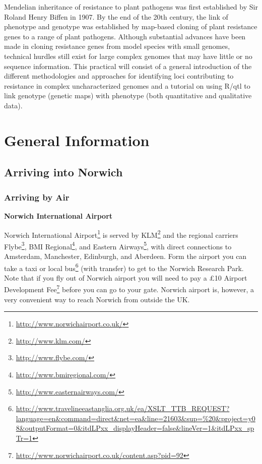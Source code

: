 \documentclass[12pt,]{book}
\let\rmarkdownfootnote\footnote%
\def\footnote{\protect\rmarkdownfootnote}
\renewcommand{\href}[2]{#2\footnote{\url{#1}}}
\begin{document}
Mendelian inheritance of resistance to plant pathogens was first
established by Sir Roland Henry Biffen in 1907. By the end of the 20th
century, the link of phenotype and genotype was established by map-based
cloning of plant resistance genes to a range of plant pathogens.
Although substantial advances have been made in cloning resistance genes
from model species with small genomes, technical hurdles still exist for
large complex genomes that may have little or no sequence information.
This practical will consist of a general introduction of the different
methodologies and approaches for identifying loci contributing to
resistance in complex uncharacterized genomes and a tutorial on using
R/qtl to link genotype (genetic maps) with phenotype (both quantitative
and qualitative data).

\chapter*{General Information}\label{general-information}

\section*{Arriving into Norwich}\label{arriving-into-norwich}

\subsection*{Arriving by Air}\label{arriving-by-air}

\textbf{Norwich International Airport}

\href{http://www.norwichairport.co.uk/}{Norwich International Airport}
is served by \href{http://www.klm.com/}{KLM} and the regional carriers
\href{http://www.flybe.com/}{Flybe},
\href{http://www.bmiregional.com/}{BMI Regional}, and
\href{http://www.easternairways.com/}{Eastern Airways}, with direct
connections to Amsterdam, Manchester, Edinburgh, and Aberdeen. Form the
airport you can take a taxi or
\href{http://www.travelineeastanglia.org.uk/ea/XSLT_TTB_REQUEST?language=en\&command=direct\&net=ea\&line=21603\&sup=\%20\&project=y08\&outputFormat=0\&itdLPxx_displayHeader=false\&lineVer=1\&itdLPxx_spTr=1}{local
bus} (with transfer) to get to the Norwich Research Park. Note that if
you fly out of Norwich airport you will need to pay a
\href{http://www.norwichairport.co.uk/content.asp?pid=92}{£10 Airport
Development Fee} before you can go to your gate. Norwich airport is,
however, a very convenient way to reach Norwich from outside the UK.
\end{document}
